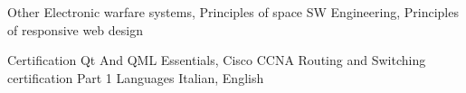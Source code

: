 \begin{cvskills}
\hline
\cvskill
{Other} %
{Electronic warfare systems, Principles of space SW Engineering, Principles of responsive web design
} %

\hline
\cvskill
{Certification} %
{Qt And QML Essentials, Cisco CCNA Routing and Switching certification Part 1} %
\hline
\cvskill
{Languages} %
{Italian, English} %


\end{cvskills}